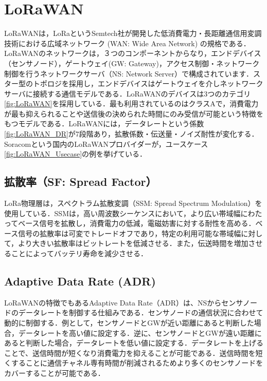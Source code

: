\section{LoRaWAN}
LoRaWANは，LoRaというSemtech社が開発した低消費電力・長距離通信用変調技術における広域ネットワーク (WAN: Wide Area Network) の規格である．LoRaWANのネットワークは，３つのコンポーネントからなり，エンドデバイス（センサノード），ゲートウェイ(GW: Gateway)，アクセス制御・ネットワーク制御を行うネットワークサーバ（NS: Network Server）で構成されています．スター型のトポロジを採用し，エンドデバイスはゲートウェイを介しネットワークサーバに接続する通信モデルである．LoRaWANのデバイスは3つのカテゴリ\ref{fig:LoRaWAN}を採用している．最も利用されているのはクラスAで，消費電力が最も抑えられることや送信後の決められた時間にのみ受信が可能という特徴をもつモデルである．LoRaWANには，データレートという係数\ref{fig:LoRaWAN_DR}が7段階あり，拡散係数・伝送量・ノイズ耐性が変化する．Soracomという国内のLoRaWANプロバイダーが，ユースケース\ref{fig:LoRaWAN_Usecase}の例を挙げている．

\subsection{拡散率（SF: Spread Factor）}
LoRa物理層は，スペクトラム拡散変調（SSM: Spread Spectrum Modulation）を使用している．SSMは，高い周波数シーケンスにおいて，より広い帯域幅にわたってベース信号を拡散し，消費電力の低減，電磁妨害に対する耐性を高める．ベース信号の拡散率は可変でトレードオフであり，特定の利用可能な帯域幅に対して，より大きい拡散率はビットレートを低減させる．また，伝送時間を増加させることによってバッテリ寿命を減少させる．

\subsection{Adaptive Data Rate (ADR)}
LoRaWANの特徴でもあるAdaptive Data Rate（ADR）は、NSからセンサノードのデータレートを制御する仕組みである．センサノードの通信状況に合わせて動的に制御する．例として，センサノードとGWが近い距離にあると判断した場合，データレートを高い値に設定する．逆に、センサノードとGWが遠い距離にあると判断した場合，データレートを低い値に設定する．データレートを上げることで、送信時間が短くなり消費電力を抑えることが可能である．送信時間を短くすることに通信チャネル専有時間が削減されるためより多くのセンサノードをカバーすることが可能である．

